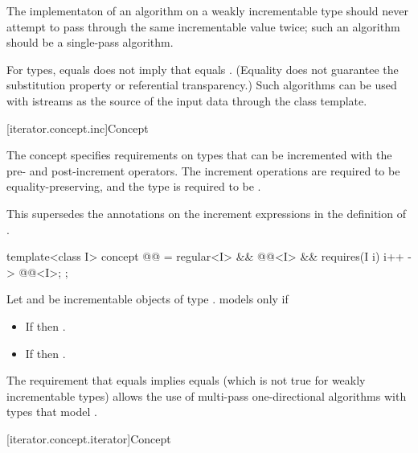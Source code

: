 \pnum
\recommended
The implementaton of an algorithm on a weakly incrementable type
should never attempt to pass through the same incrementable value twice;
such an algorithm should be a single-pass algorithm.
\begin{note}
For  types,  equals  does not imply that 
equals . (Equality does not guarantee the substitution property or referential
transparency.)
Such algorithms
can be used with istreams as the source of the input data through the  class
template.
\end{note}

[iterator.concept.inc]{Concept }

\pnum
The  concept specifies requirements on types that can be incremented with the pre-
and post-increment operators. The increment operations are required to be equality-preserving,
and the type is required to be .
\begin{note}
This supersedes the annotations on the increment expressions
in the definition of .
\end{note}

\begin{codeblock}
template<class I>
  concept @@ =
    regular<I> &&
    @@<I> &&
    requires(I i) {
      { i++ } -> @@<I>;
    };
\end{codeblock}

\pnum
Let  and  be incrementable objects of type .
 models  only if
\begin{itemize}
\item If  then .
\item If  then .
\end{itemize}

\pnum
\begin{note}
The requirement that
 equals 
implies
 equals 
(which is not true for weakly incrementable types)
allows the use of multi-pass one-directional
algorithms with types that model .
\end{note}

[iterator.concept.iterator]{Concept }

